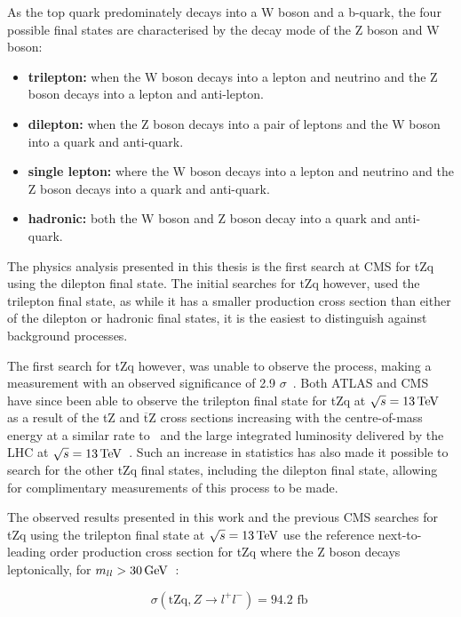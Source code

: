 As the top quark predominately decays into a W boson and a b-quark, the four possible final states are characterised by the decay mode of the Z boson and W boson:
\begin{itemize}
\item \textbf{trilepton:} when the W boson decays into a lepton and neutrino and the Z boson decays into a lepton and anti-lepton.
\item \textbf{dilepton:} when the Z boson decays into a pair of leptons and the W boson into a quark and anti-quark. 
\item \textbf{single lepton:} where the W boson decays into a lepton and neutrino and the Z boson decays into a quark and anti-quark.
\item \textbf{hadronic:} both the W boson and Z boson decay into a quark and anti-quark.
\end{itemize}

The physics analysis presented in this thesis is the first search at CMS for tZq using the dilepton final state.
The initial searches for tZq however, used the trilepton final state, as while it has a smaller production cross section than either of the dilepton or hadronic final states, it is the easiest to distinguish against background processes.

The first search for tZq however, was unable to observe the process, making a measurement with an observed significance of 2.9 $\sigma$~\cite{Sirunyan:2017kkr}.
Both ATLAS and CMS have since been able to observe the trilepton final state for tZq at $\sqrt{s} = 13\,\text{Te\hspace{-.08em}V}$ as a result of the tZ and $\overline{\text{t}}$Z cross sections increasing with the centre-of-mass energy at a similar rate to \ttZ~and the large integrated luminosity delivered by the LHC at $\sqrt{s} = 13\,\text{Te\hspace{-.08em}V}$~\cite{Aaboud:2017ylb,Sirunyan:2017nbr}.
Such an increase in statistics has also made it possible to search for the other tZq final states, including the dilepton final state, allowing for complimentary measurements of this process to be made.

The observed results presented in this work and the previous CMS searches for tZq using the trilepton final state at $\sqrt{s} = 13\,\text{Te\hspace{-.08em}V}$ use the reference next-to-leading order production cross section for tZq where the Z boson decays leptonically, for $m_{ll} > 30 \,\text{Ge\hspace{-.08em}V}$~\cite{Sirunyan:2017nbr}:

\begin{equation}
\sigma ( \textrm{tZq}, Z \rightarrow l^{+} l^{-}) = \textrm{94.2 fb} \;
\label{tZqCrossSection}
\end{equation}

